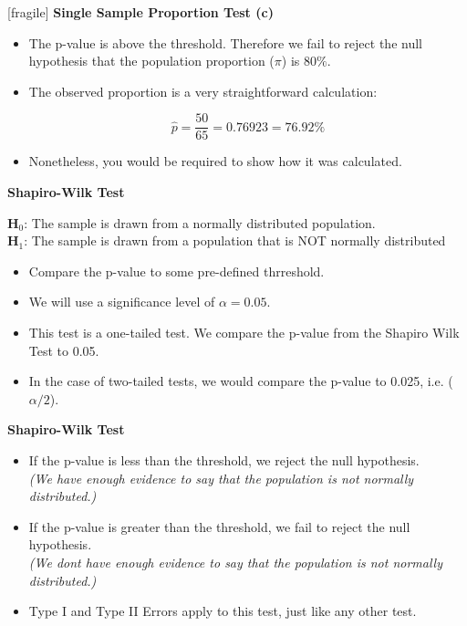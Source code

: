 \documentclass[]{report}
\begin{document}
	
	
	
	[fragile]
	\textbf{Single Sample Proportion Test (c)}
	
	\begin{itemize}
		\item The p-value is above the threshold. Therefore we fail to reject the null hypothesis that the population proportion ($\pi$) is $80\%$.
		
		\item The observed proportion is a very straightforward calculation:
		
		\[ \hat{p} = \frac{50}{65} = 0.76923= 76.92\%\]
		\item Nonetheless, you would be required to show how it was calculated.
	\end{itemize}
	
	
	

	\textbf{Shapiro-Wilk Test}
	\begin{framed}
		
		\textbf{H$_{0}$}: The sample is drawn from a normally distributed population.\\ \smallskip
		\textbf{H$_{1}$}: The sample is drawn from a population that is NOT normally distributed
		
	\end{framed}
	
	\begin{itemize}
		\item Compare the p-value to some pre-defined thrreshold.
		\item We will use a significance level of $\alpha=0.05$.
		\item This test is a one-tailed test. We compare the p-value from the Shapiro Wilk Test to 0.05.
		\item In the case of two-tailed tests, we would compare the p-value to 0.025, i.e. ($\alpha/2$).
	\end{itemize}
	
	
	\textbf{Shapiro-Wilk Test}
	
	\begin{itemize}
		\item If the p-value is less than the threshold, we reject the null hypothesis.\\
		\textit{(We have enough evidence to say that the population is not normally distributed.)}
		
		\smallskip
		\item If the p-value is greater than the threshold, we fail to reject the null hypothesis. \\ \textit{(We dont have enough evidence to say that the population is not normally distributed.)}
		\smallskip
		
		\item Type I and Type II Errors apply to this test, just like any other test.
		
	\end{itemize}	
	
\end{document}
